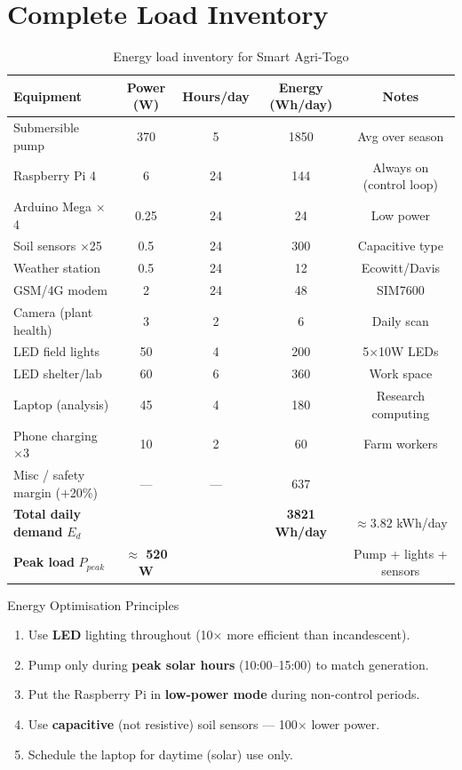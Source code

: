\documentclass[12pt,a4paper,openany]{book}
\begin{document}
\section{Complete Load Inventory}

\begin{table}[H]
\centering
\caption{Energy load inventory for Smart Agri-Togo}
\label{tab:loads}
\renewcommand{\arraystretch}{1.35}
\begin{tabular}{lcccc}
\toprule
\textbf{Equipment}&\textbf{Power (W)}&\textbf{Hours/day}&\textbf{Energy (Wh/day)}&\textbf{Notes}\\
\midrule
Submersible pump & 370 & 5 & 1850 & Avg over season\\
Raspberry Pi 4 & 6 & 24 & 144 & Always on (control loop)\\
Arduino Mega $\times$4 & 0.25 & 24 & 24 & Low power\\
Soil sensors $\times$25 & 0.5 & 24 & 300 & Capacitive type\\
Weather station & 0.5 & 24 & 12 & Ecowitt/Davis\\
GSM/4G modem & 2 & 24 & 48 & SIM7600\\
Camera (plant health) & 3 & 2 & 6 & Daily scan\\
LED field lights & 50 & 4 & 200 & 5$\times$10W LEDs\\
LED shelter/lab & 60 & 6 & 360 & Work space\\
Laptop (analysis) & 45 & 4 & 180 & Research computing\\
Phone charging $\times$3 & 10 & 2 & 60 & Farm workers\\
Misc / safety margin ($+$20\%) & — & — & 637 & \\
\midrule
\textbf{Total daily demand} $E_d$ & & & \textbf{3821 Wh/day} & $\approx3.82$ kWh/day\\
\midrule
\textbf{Peak load} $P_{peak}$ & \textbf{$\approx$ 520 W} & & & Pump + lights + sensors\\
\bottomrule
\end{tabular}
\end{table}

\begin{keybox}{Energy Optimisation Principles}
\begin{enumerate}[leftmargin=1.5em,label=\arabic*.]
  \item Use \textbf{LED} lighting throughout (10$\times$ more efficient than incandescent).
  \item Pump only during \textbf{peak solar hours} (10:00--15:00) to match generation.
  \item Put the Raspberry Pi in \textbf{low-power mode} during non-control periods.
  \item Use \textbf{capacitive} (not resistive) soil sensors — 100$\times$ lower power.
  \item Schedule the laptop for daytime (solar) use only.
\end{enumerate}
\end{keybox}
\end{document}
